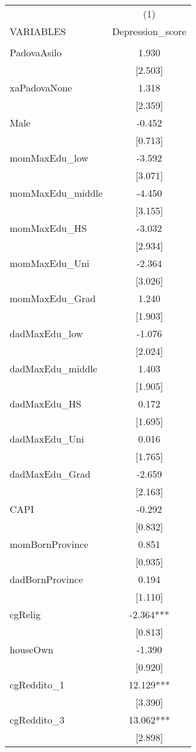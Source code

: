 \documentclass[]{article}
\begin{document}
\begin{tabular}{lc} \hline
 & (1) \\
VARIABLES & Depression\_score \\ \hline
 &  \\
PadovaAsilo & 1.930 \\
 & [2.503] \\
xaPadovaNone & 1.318 \\
 & [2.359] \\
Male & -0.452 \\
 & [0.713] \\
momMaxEdu\_low & -3.592 \\
 & [3.071] \\
momMaxEdu\_middle & -4.450 \\
 & [3.155] \\
momMaxEdu\_HS & -3.032 \\
 & [2.934] \\
momMaxEdu\_Uni & -2.364 \\
 & [3.026] \\
momMaxEdu\_Grad & 1.240 \\
 & [1.903] \\
dadMaxEdu\_low & -1.076 \\
 & [2.024] \\
dadMaxEdu\_middle & 1.403 \\
 & [1.905] \\
dadMaxEdu\_HS & 0.172 \\
 & [1.695] \\
dadMaxEdu\_Uni & 0.016 \\
 & [1.765] \\
dadMaxEdu\_Grad & -2.659 \\
 & [2.163] \\
CAPI & -0.292 \\
 & [0.832] \\
momBornProvince & 0.851 \\
 & [0.935] \\
dadBornProvince & 0.194 \\
 & [1.110] \\
cgRelig & -2.364*** \\
 & [0.813] \\
houseOwn & -1.390 \\
 & [0.920] \\
cgReddito\_1 & 12.129*** \\
 & [3.390] \\
cgReddito\_3 & 13.062*** \\
 & [2.898] \\

\end{tabular}
\end{document}
